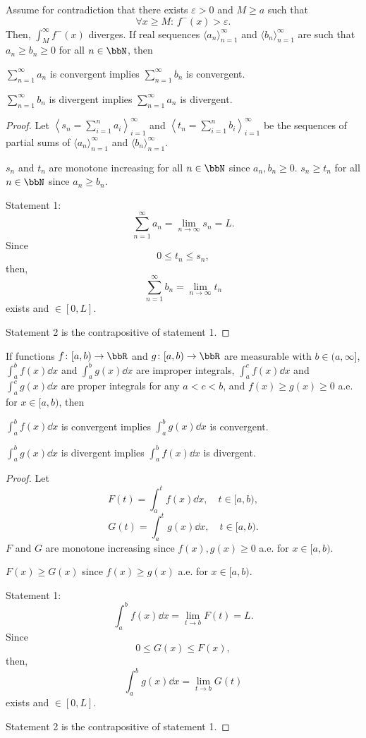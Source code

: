 Assume for contradiction that there exists $\varepsilon>0$ and $M\geq a$ such that
\[\forall x\geq M:\,f^-(x)>\varepsilon.\]
Then, $\int_M^{\infty}f^-(x)$ diverges.
\epr
{}
If real sequences $\langle a_n\rangle_{n=1}^{\infty}$ and $\langle b_n\rangle_{n=1}^{\infty}$ are such that $a_n\geq b_n\geq 0$ for all $n\in\bbN$, then
\ben
\item $\sum_{n=1}^{\infty}a_n$ is convergent implies $\sum_{n=1}^{\infty}b_n$ is convergent.
\item $\sum_{n=1}^{\infty}b_n$ is divergent implies $\sum_{n=1}^{\infty}a_n$ is divergent.
\een
\begin{proof}
Let $\left\langle s_n=\sum_{i=1}^na_i\right\rangle_{i=1}^{\infty}$ and $\left\langle t_n=\sum_{i=1}^nb_i\right\rangle_{i=1}^{\infty}$ be the sequences of partial sums of $\langle a_n\rangle_{n=1}^{\infty}$ and $\langle b_n\rangle_{n=1}^{\infty}$.

$s_n$ and $t_n$ are monotone increasing for all $n\in\bbN$ since $a_n,b_n\geq 0$. $s_n\geq t_n$ for all $n\in\bbN$ since $a_n\geq b_n$.

Statement 1:
\[\sum_{n=1}^{\infty}a_n=\lim_{n\to\infty}s_n=L.\]
Since
\[0\leq t_n\leq s_n,\]
then,
\[\sum_{n=1}^{\infty}b_n=\lim_{n\to\infty}t_n\]
exists and $\in[0,L]$.

Statement 2 is the contrapositive of statement 1.
\end{proof}
If functions $f\colon [a,b)\to\bbR$ and $g\colon [a,b)\to\bbR$ are measurable with $b\in(a,\infty]$, $\int_a^bf(x)\dd{x}$ and $\int_a^bg(x)\dd{x}$ are improper integrals, $\int_a^cf(x)\dd{x}$ and $\int_a^cg(x)\dd{x}$ are proper integrals for any $a<c<b$,
and $f(x)\geq g(x)\geq 0$ a.e. for $x\in[a,b)$, then
\ben
\item $\int_a^bf(x)\dd{x}$ is convergent implies $\int_a^bg(x)\dd{x}$ is convergent.
\item $\int_a^bg(x)\dd{x}$ is divergent implies $\int_a^bf(x)\dd{x}$ is divergent.
\een
\begin{proof}
Let
\[F(t)=\int_a^tf(x)\dd{x},\quad t\in[a,b),\]
\[G(t)=\int_a^tg(x)\dd{x},\quad t\in[a,b).\]
$F$ and $G$ are monotone increasing since $f(x),g(x)\geq 0$ a.e. for $x\in[a,b)$.

$F(x)\geq G(x)$ since $f(x)\geq g(x)$ a.e. for $x\in[a,b)$.

Statement 1:
\[\int_a^bf(x)\dd{x}=\lim_{t\to b}F(t)=L.\]
Since
\[0\leq G(x)\leq F(x),\]
then,
\[\int_a^bg(x)\dd{x}=\lim_{t\to b}G(t)\]
exists and $\in [0,L]$.

Statement 2 is the contrapositive of statement 1.
\end{proof}
